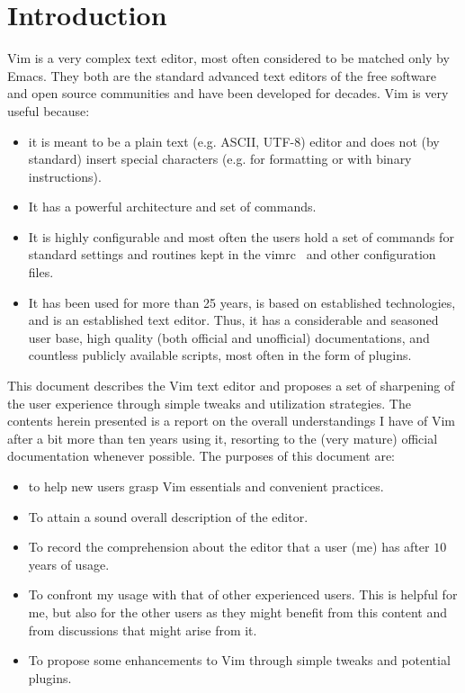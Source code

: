 \documentclass{article}
\begin{document}
\section{Introduction}\label{intro}
Vim is a very complex text editor,
most often considered to be
matched only by Emacs.
They both are the standard advanced text editors
of the free software and open source communities
and have been developed for decades.
Vim is very useful because:
\begin{itemize}
  \item it is meant to be a plain text (e.g. ASCII, UTF-8) editor
  and does not (by standard) insert special characters (e.g. for
    formatting or with binary instructions).
  \item It has a powerful architecture and set of commands.
  \item It is highly configurable and most often the users
  hold a set of commands for standard settings and routines kept in
    the vimrc~\cite{vimrc} and other configuration files.
  \item It has been used for more than 25 years, is based on
    established technologies, and is an established text editor.
    Thus, it has a considerable and seasoned user
    base, high quality (both official and unofficial) documentations, 
    and countless publicly available scripts, most often in the form of
    plugins.
\end{itemize}

This document describes the Vim text editor
and proposes a set of sharpening of the user
experience through simple tweaks
and utilization strategies.
The contents herein presented is a
report on the overall understandings I
have of Vim after a bit more
than ten years using it,
resorting to the (very mature) official documentation
whenever possible.
The purposes of this document are:
\begin{itemize}
  \item to help new users grasp Vim essentials
  and convenient practices.
  \item To attain a sound overall description of the editor.
  \item To record the comprehension about the editor that
  a user (me) has after $10$ years of usage.
  \item To confront my usage with that of other experienced
  users. This is helpful for me, but also for the other users
  as they might benefit from this content and from discussions
  that might arise from it.
  \item To propose some enhancements to Vim through simple tweaks and potential plugins.
\end{itemize}
\end{document}
